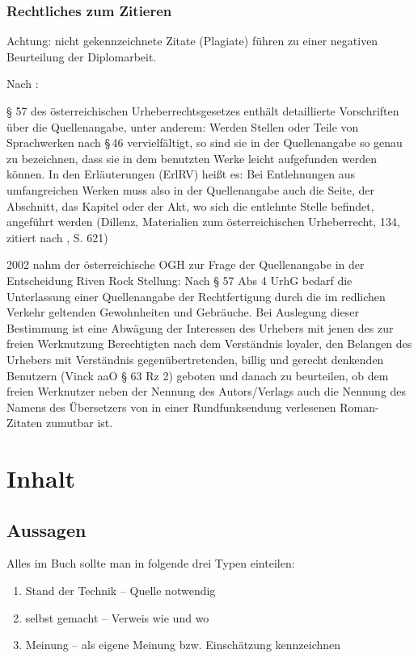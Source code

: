 \subsubsection{Rechtliches zum Zitieren}

Achtung: nicht gekennzeichnete Zitate (Plagiate) führen zu einer negativen
Beurteilung der Diplomarbeit.

Nach \citep{wiki:quelle}:

§ 57 des österreichischen Urheberrechtsgesetzes\citep{ris57} enthält
detaillierte Vorschriften über die Quellenangabe, unter anderem: Werden
Stellen oder Teile von Sprachwerken nach §\,46 vervielfältigt, so
sind sie in der Quellenangabe so genau zu bezeichnen, dass sie in
dem benutzten Werke leicht aufgefunden werden können. In den Erläuterungen
(ErlRV) heißt es: Bei Entlehnungen aus umfangreichen Werken muss also
in der Quellenangabe auch die Seite, der Abschnitt, das Kapitel oder
der Akt, wo sich die entlehnte Stelle befindet, angeführt werden (Dillenz,
Materialien zum österreichischen Urheberrecht, 134, zitiert nach \citep{dittrich},
S. 621)

2002 nahm der österreichische OGH zur Frage der Quellenangabe in der
Entscheidung Riven Rock Stellung: Nach § 57 Abs 4 UrhG bedarf die
Unterlassung einer Quellenangabe der Rechtfertigung durch die im redlichen
Verkehr geltenden Gewohnheiten und Gebräuche. Bei Auslegung dieser
Bestimmung ist eine Abwägung der Interessen des Urhebers mit jenen
des zur freien Werknutzung Berechtigten nach dem Verständnis loyaler,
den Belangen des Urhebers mit Verständnis gegenübertretenden, billig
und gerecht denkenden Benutzern (Vinck aaO § 63 Rz 2) geboten und
danach zu beurteilen, ob dem freien Werknutzer neben der Nennung des
Autors/Verlags auch die Nennung des Namens des Übersetzers von in
einer Rundfunksendung verlesenen Roman-Zitaten zumutbar ist.


\section{Inhalt}


\subsection{Aussagen}

Alles im Buch sollte man in folgende drei Typen einteilen:
\begin{enumerate}
\item Stand der Technik -- Quelle notwendig
\item selbst gemacht -- Verweis wie und wo
\item Meinung -- als eigene Meinung bzw. Einschätzung kennzeichnen
\end{enumerate}

